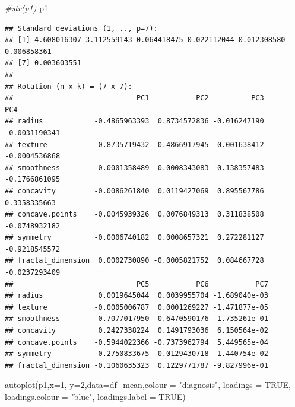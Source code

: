 \documentclass[
  11pt,
]{article}
\newenvironment{Shaded}{\begin{snugshade}}{\end{snugshade}}
\newcommand{\AttributeTok}[1]{\textcolor[rgb]{0.77,0.63,0.00}{#1}}
\newcommand{\CommentTok}[1]{\textcolor[rgb]{0.56,0.35,0.01}{\textit{#1}}}
\newcommand{\ConstantTok}[1]{\textcolor[rgb]{0.00,0.00,0.00}{#1}}
\newcommand{\DecValTok}[1]{\textcolor[rgb]{0.00,0.00,0.81}{#1}}
\newcommand{\FunctionTok}[1]{\textcolor[rgb]{0.00,0.00,0.00}{#1}}
\newcommand{\NormalTok}[1]{#1}
\newcommand{\StringTok}[1]{\textcolor[rgb]{0.31,0.60,0.02}{#1}}
\begin{document}
\begin{Shaded}
\begin{Highlighting}[]
\CommentTok{\#str(p1)}
\NormalTok{p1}
\end{Highlighting}
\end{Shaded}

\begin{verbatim}
## Standard deviations (1, .., p=7):
## [1] 4.608016307 3.112559143 0.064418475 0.022112044 0.012308580 0.006858361
## [7] 0.003603551
## 
## Rotation (n x k) = (7 x 7):
##                             PC1           PC2          PC3           PC4
## radius            -0.4865963393  0.8734572836 -0.016247190 -0.0031190341
## texture           -0.8735719432 -0.4866917945 -0.001638412 -0.0004536868
## smoothness        -0.0001358489  0.0008343083  0.138357483 -0.1766861095
## concavity         -0.0086261840  0.0119427069  0.895567786  0.3358335663
## concave.points    -0.0045939326  0.0076849313  0.311838508 -0.0748932182
## symmetry          -0.0006740182  0.0008657321  0.272281127 -0.9218545572
## fractal_dimension  0.0002730890 -0.0005821752  0.084667728 -0.0237293409
##                             PC5           PC6           PC7
## radius             0.0019645044  0.0039955704 -1.689040e-03
## texture           -0.0005006787  0.0001269227 -1.471877e-05
## smoothness        -0.7077017950  0.6470590176  1.735261e-01
## concavity          0.2427338224  0.1491793036  6.150564e-02
## concave.points    -0.5944022366 -0.7373962794  5.449565e-04
## symmetry           0.2750833675 -0.0129430718  1.440754e-02
## fractal_dimension -0.1060635323  0.1229771787 -9.827996e-01
\end{verbatim}

\begin{Shaded}
\begin{Highlighting}[]
\FunctionTok{autoplot}\NormalTok{(p1,}\AttributeTok{x=}\DecValTok{1}\NormalTok{, }\AttributeTok{y=}\DecValTok{2}\NormalTok{,}\AttributeTok{data=}\NormalTok{df\_mean,}\AttributeTok{colour =} \StringTok{"diagnosis"}\NormalTok{, }\AttributeTok{loadings =} \ConstantTok{TRUE}\NormalTok{, }\AttributeTok{loadings.colour =} \StringTok{"blue"}\NormalTok{,}
         \AttributeTok{loadings.label =} \ConstantTok{TRUE}\NormalTok{)}
\end{Highlighting}
\end{Shaded}
\end{document}
